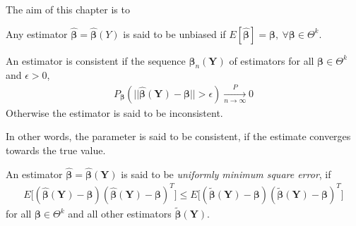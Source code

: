 The aim of this chapter is to 

\begin{definition} 
\label{def:Unbiased_estmator}
Any estimator $\boldsymbol{\hat{\beta}} = \boldsymbol{\hat{\beta}}(Y)$ is said to be unbiased if $E[\boldsymbol{\hat{\beta}}] = \boldsymbol{\beta}, \ \forall \boldsymbol{\beta} \in \Theta^k$.
\end{definition}

\begin{definition} 
\label{def:consistent_estimator}
An estimator is consistent if the sequence $\boldsymbol{\beta}_n(\textbf{Y})$ of estimators for all $\boldsymbol{\beta} \in \Theta^k$ and $\epsilon > 0$,
\begin{align*}
    P_{\boldsymbol{\beta}}(||\hat{\boldsymbol{\beta}}(\textbf{Y}) - \boldsymbol{\beta}|| > \epsilon) \xrightarrow[n \rightarrow \infty]{P} 0
\end{align*}
Otherwise the estimator is said to be inconsistent. 
\end{definition}
In other words, the parameter is said to be consistent, if the estimate converges towards the true value. 

\begin{definition} 
\label{def:minimum_mean_square_error}
An estimator $\boldsymbol{\hat{\beta}}=\boldsymbol{\hat{\beta}}(\textbf{Y})$ is said to be \textit{uniformly minimum square error}, if
\begin{align*}
    E\big[ (\boldsymbol{\hat{\beta}}(\textbf{Y})-\boldsymbol{\beta})(\boldsymbol{\hat{\beta}}(\textbf{Y})-\boldsymbol{\beta})^T \big] \leq E\big[ (\boldsymbol{\tilde{\beta}}(\textbf{Y})-\boldsymbol{\beta})(\boldsymbol{\tilde{\beta}}(\textbf{Y})-\boldsymbol{\beta})^T \big]
\end{align*} 
for all $\boldsymbol{\beta} \in \Theta^k $ and all other estimators $\boldsymbol{\tilde{\beta}(\textbf{Y})}$.
 \end{definition}

